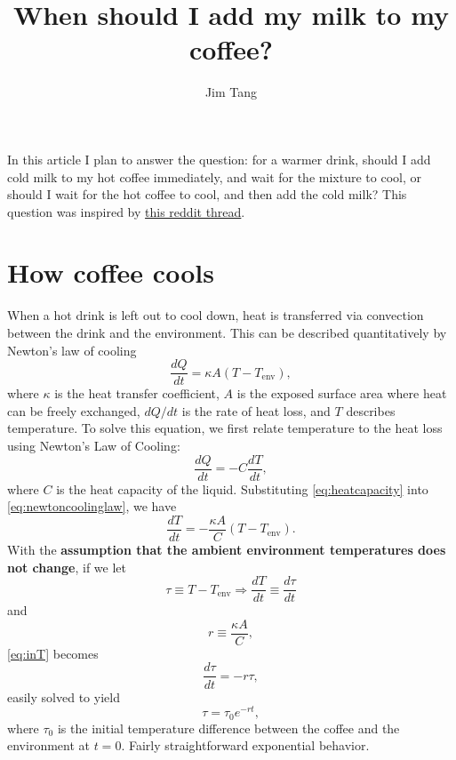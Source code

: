 \documentclass[11pt]{article}
\title{When should I add my milk to my coffee?}
\author{Jim Tang}
\begin{document}
  \maketitle
	
In this article I plan to answer the question: for a warmer drink, should I add cold milk to my hot coffee immediately, and wait for the mixture to cool, or should I wait for the hot coffee to cool, and then add the cold milk? This question was inspired by \href{http://www.reddit.com/r/askscience/comments/2zwzf2/will_my_cup_of_100c_tea_cool_faster_if_i_let_it/}{this reddit thread}.

\section{How coffee cools}

When a hot drink is left out to cool down, heat is transferred via convection between the drink and the environment. This can be described quantitatively by Newton's law of cooling
\begin{equation}
\frac{dQ}{dt} = \kappa A (T - T_{\text{env}}) \label{eq:newtoncoolinglaw},
\end{equation}
where $\kappa$ is the heat transfer coefficient, $A$ is the exposed surface area where heat can be freely exchanged, $dQ/dt$ is the rate of heat loss, and $T$ describes temperature. To solve this equation, we first relate temperature to the heat loss using Newton's Law of Cooling:
\begin{equation}
\frac{dQ}{dt} = -C\frac{dT}{dt} \label{eq:heatcapacity},
\end{equation}
where $C$     is the heat capacity of the liquid. Substituting \eqref{eq:heatcapacity} into \eqref{eq:newtoncoolinglaw}, we have
\begin{equation}
\frac{dT}{dt} = -\frac{\kappa A}{C} (T - T_{\text{env}}) \label{eq:inT}.
\end{equation}
With the \textbf{assumption that the ambient environment temperatures does not change}, if we let
\begin{equation}
\tau \equiv T - T_{\text{env}} \Rightarrow \frac{dT}{dt} \equiv \frac{d\tau}{dt} \label{eq:tau-sub}
\end{equation}
and
\begin{equation}
r \equiv \frac{\kappa A}{C}, \label{eq:r-sub}
\end{equation}
\eqref{eq:inT} becomes
\begin{equation*}
\frac{d\tau}{dt} = -r\tau,
\end{equation*}
easily solved to yield
\begin{equation}
\tau = \tau_{0} e^{-rt} \label{eq:newtoncoolinglaw-soln},
\end{equation}
where $\tau_{0}$ is the initial temperature difference between the coffee and the environment at $t=0$. Fairly straightforward exponential behavior.
\end{document}
